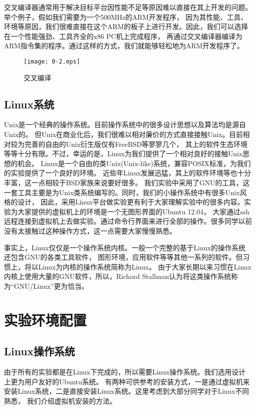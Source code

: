 交叉编译器通常用于解决目标平台因性能不足等原因难以直接在其上开发的问题。举个例子，假如我们需要为一个500MHz的ARM开发程序，
因为其性能、工具、环境等原因，我们很难直接在这个ARM的板子上进行开发。因此，我们可以选择在一个性能强劲、工具齐全的x86 PC机上完成程序，
再通过交叉编译器编译为ARM指令集的程序。通过这样的方式，我们就能够轻松地为ARM开发程序了。

\begin{figure}[htbp]
  \centering
  \texttt{[image: 0-2.eps]}
  \caption{交叉编译}\label{fig:0-2}
\end{figure}

\subsection{Linux系统}
Unix是一个经典的操作系统。目前操作系统中的很多设计思想以及算法均是源自Unix的。
但Unix在商业化后，我们很难以相对廉价的方式直接接触Unix。目前相对较为完善的自由的Unix衍生版仅有FreeBSD等寥寥几个，
其上的软件生态环境等等十分有限。不过，幸运的是，Linux为我们提供了一个相对良好的接触Unix思想的机会。
Linux是一个自由的类Unix(Unix-like)系统，兼容POSIX标准，为我们的实验提供了一个良好的环境。
近些年Linux发展迅猛，其上的软件环境等也十分丰富，这一点相较于BSD家族来说要好很多。
我们实验中采用了GNU的工具，这一套工具主要是为Unix类系统编写的。同时，我们的小操作系统中有很多Unix风格的设计，
因此，采用Linux平台做实验更有利于大家理解实验中的很多内容。实验为大家提供的虚拟机上的环境是一个无图形界面的Ubuntu 12.04，
大家通过ssh远程连接到虚拟机上去做实验。通过命令行界面来进行全部的操作。很多同学以前没有太接触过这种操作方式，这一点需要大家慢慢熟悉。

\begin{note}
事实上，Linux仅仅是一个操作系统内核。一般一个完整的基于Linux的操作系统还包含GNU的各类工具软件，
图形环境，应用软件等等其他一系列的软件。但习惯上，将以Linux为内核的操作系统简称为Linux。
由于大家长期以来习惯在Linux内核上使用大量的GNU软件，所以，Richard Stallman认为将这类操作系统称为“GNU/Linux”更为恰当。
\end{note}

\section{实验环境配置}

\subsection{Linux操作系统}
由于所有的实验都是在Linux下完成的，所以需要Linux操作系统。我们选用设计上更为用户友好的Ubuntu系统。
有两种可供参考的安装方式，一是通过虚拟机来安装Linux系统，二是直接安装Linux系统。这里考虑到大部分同学对于Linux不同熟悉，
我们介绍虚拟机安装的方法。

